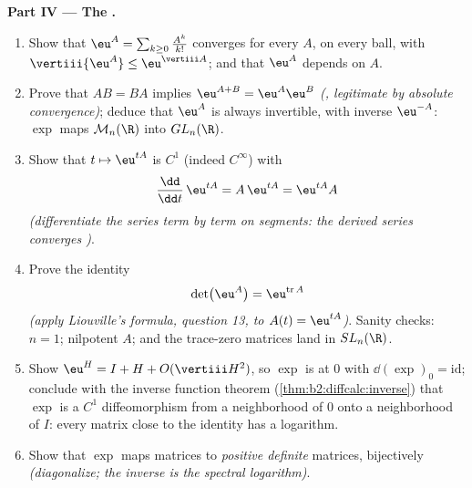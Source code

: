 \begin{problem}
\medskip
\noindent\textbf{Part IV --- The .}
\begin{enumerate}[resume]
  \item Show that $\eu^A = \sum_{k\geq0}\frac{A^k}{k!}$
        converges  for every $A$,  on every
        ball, with $\vertiii{\eu^A} \leq
        \eu^{\vertiii A}$; and that $\eu^A$ depends
         on $A$.
  \item Prove that $AB = BA$ implies $\eu^{A+B} =
        \eu^A\eu^B$ \emph{(, legitimate by
        absolute convergence)}; deduce that $\eu^A$ is always
        invertible, with inverse $\eu^{-A}$: $\exp$ maps
        $\mathcal M_n(\R)$ into $GL_n(\R)$.
  \item Show that $t \mapsto \eu^{tA}$ is $C^1$ (indeed
        $C^\infty$) with
        \[
        \frac{\dd}{\dd t}\,\eu^{tA} = A\,\eu^{tA} =
        \eu^{tA}A
        \]
        \emph{(differentiate the series term by term on
        segments: the derived series converges )}.
  \item Prove the identity
        \[
        \det\bigl(\eu^{A}\bigr) = \eu^{\operatorname{tr}A}
        \]
        \emph{(apply Liouville's formula, question 13, to
        $A(t) = \eu^{tA}$)}. Sanity checks: $n = 1$; nilpotent
        $A$; and the trace-zero matrices land in
        $SL_n(\R)$.
  \item Show $\eu^H = I + H + O(\vertiii H^2)$, so $\exp$ is
         at $0$ with $\dd(\exp)_0 =
        \mathrm{id}$; conclude with the inverse function
        theorem (\cref{thm:b2:diffcalc:inverse}) that $\exp$
        is a $C^1$ diffeomorphism from a neighborhood of $0$
        onto a neighborhood of $I$: every matrix close to the
        identity has a logarithm.
  \item Show that $\exp$ maps  matrices to 
        \emph{positive definite} matrices, bijectively
        \emph{(diagonalize; the inverse is the spectral
        logarithm)}.
\end{enumerate}


\end{problem}

